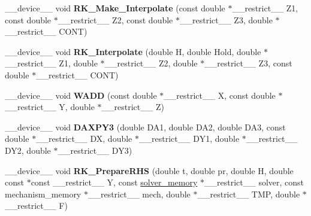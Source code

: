 \begin{DoxyCompactItemize}
\item 
\+\_\+\+\_\+device\+\_\+\+\_\+ void {\bfseries R\+K\+\_\+\+Make\+\_\+\+Interpolate} (const double $\ast$\+\_\+\+\_\+restrict\+\_\+\+\_\+ Z1, const double $\ast$\+\_\+\+\_\+restrict\+\_\+\+\_\+ Z2, const double $\ast$\+\_\+\+\_\+restrict\+\_\+\+\_\+ Z3, double $\ast$\+\_\+\+\_\+restrict\+\_\+\+\_\+ C\+O\+NT)\hypertarget{radau2a_8cu_aae1ce6a3507f0f2afcc59b0ffab07ce0}{}\label{radau2a_8cu_aae1ce6a3507f0f2afcc59b0ffab07ce0}

\item 
\+\_\+\+\_\+device\+\_\+\+\_\+ void {\bfseries R\+K\+\_\+\+Interpolate} (double H, double Hold, double $\ast$\+\_\+\+\_\+restrict\+\_\+\+\_\+ Z1, double $\ast$\+\_\+\+\_\+restrict\+\_\+\+\_\+ Z2, double $\ast$\+\_\+\+\_\+restrict\+\_\+\+\_\+ Z3, const double $\ast$\+\_\+\+\_\+restrict\+\_\+\+\_\+ C\+O\+NT)\hypertarget{radau2a_8cu_ae7ef583c7c5164839e5ed7d761021679}{}\label{radau2a_8cu_ae7ef583c7c5164839e5ed7d761021679}

\item 
\+\_\+\+\_\+device\+\_\+\+\_\+ void {\bfseries W\+A\+DD} (const double $\ast$\+\_\+\+\_\+restrict\+\_\+\+\_\+ X, const double $\ast$\+\_\+\+\_\+restrict\+\_\+\+\_\+ Y, double $\ast$\+\_\+\+\_\+restrict\+\_\+\+\_\+ Z)\hypertarget{radau2a_8cu_aff01576484bab84fa153493d0aa0833f}{}\label{radau2a_8cu_aff01576484bab84fa153493d0aa0833f}

\item 
\+\_\+\+\_\+device\+\_\+\+\_\+ void {\bfseries D\+A\+X\+P\+Y3} (double D\+A1, double D\+A2, double D\+A3, const double $\ast$\+\_\+\+\_\+restrict\+\_\+\+\_\+ DX, double $\ast$\+\_\+\+\_\+restrict\+\_\+\+\_\+ D\+Y1, double $\ast$\+\_\+\+\_\+restrict\+\_\+\+\_\+ D\+Y2, double $\ast$\+\_\+\+\_\+restrict\+\_\+\+\_\+ D\+Y3)\hypertarget{radau2a_8cu_a99527de910c5b79e3543df52bd069a58}{}\label{radau2a_8cu_a99527de910c5b79e3543df52bd069a58}

\item 
\+\_\+\+\_\+device\+\_\+\+\_\+ void {\bfseries R\+K\+\_\+\+Prepare\+R\+HS} (double t, double pr, double H, double const $\ast$const \+\_\+\+\_\+restrict\+\_\+\+\_\+ Y, const \hyperlink{structsolver__memory}{solver\+\_\+memory} $\ast$\+\_\+\+\_\+restrict\+\_\+\+\_\+ solver, const mechanism\+\_\+memory $\ast$\+\_\+\+\_\+restrict\+\_\+\+\_\+ mech, double $\ast$\+\_\+\+\_\+restrict\+\_\+\+\_\+ T\+MP, double $\ast$\+\_\+\+\_\+restrict\+\_\+\+\_\+ F)\hypertarget{radau2a_8cu_ad3700bc56945a6ff0b7bd7251cf86b9d}{}\label{radau2a_8cu_ad3700bc56945a6ff0b7bd7251cf86b9d}


\end{DoxyCompactItemize}
